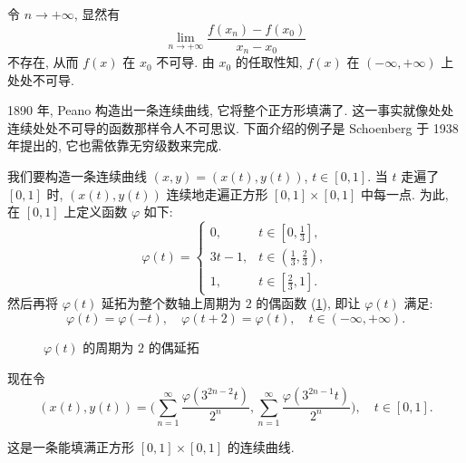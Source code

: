 令 $n\to+\infty$, 显然有
\[
  \lim_{n\to+\infty}\frac{f(x_{n})-f(x_{0})}{x_{n}-x_{0}}
\]
不存在, 从而 $f(x)$ 在 $x_{0}$ 不可导. 由 $x_{0}$ 的任取性知, $f(x)$ 在 $(-\infty,+\infty)$ 上处处不可导.

\begin{example}[填满正方形的连续曲线]\label{ex:13.2.15}
1890 年, Peano 构造出一条连续曲线, 它将整个正方形填满了. 这一事实就像处处连续处处不可导的函数那样令人不可思议. 下面介绍的例子是 Schoenberg 于 1938 年提出的, 它也需依靠无穷级数来完成.
\end{example}

我们要构造一条连续曲线 $(x,y)=(x(t),y(t))$, $t\in[0,1]$. 当 $t$ 走遍了 $[0,1]$ 时, $(x(t),y(t))$ 连续地走遍正方形 $[0,1]\times[0,1]$ 中每一点. 为此, 在 $[0,1]$ 上定义函数 $\varphi$ 如下:
\[
  \varphi(t)=\begin{cases}
    0, & t\in\left[0,\frac{1}{3}\right],\\
    3t-1, & t\in\left(\frac{1}{3},\frac{2}{3}\right),\\
    1, & t\in\left[\frac{2}{3},1\right].
\end{cases}
\]
然后再将 $\varphi(t)$ 延拓为整个数轴上周期为 $2$ 的偶函数 (\cref{fig:13.2.7}), 即让 $\varphi(t)$ 满足:
\[
  \varphi(t)=\varphi(-t),\quad\varphi(t+2)=\varphi(t),\quad t\in(-\infty,+\infty).
\]

\begin{figure}[htbp]
  \centering
  \caption{$\varphi(t)$ 的周期为 $2$ 的偶延拓}\label{fig:13.2.7}
\end{figure}

现在令
\[
  (x(t),y(t))=\biggl(\sum_{n=1}^{\infty}\frac{\varphi(3^{2n-2}t)}{2^{n}},\sum_{n=1}^{\infty}\frac{\varphi(3^{2n-1}t)}{2^{n}}\biggr),\quad t\in[0,1].
\]

这是一条能填满正方形 $[0,1]\times[0,1]$ 的连续曲线.

